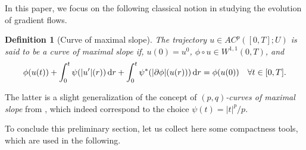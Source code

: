 \documentclass[reqno]{amsart}
\newcommand{\dr}{{\rm d} r}
\renewcommand{\sl}{|\partial \phi|}
\newtheorem{definition}[theorem]{Definition}
\begin{document}
In this paper, we focus on the following classical notion  \cite{Muratori-Savare} in studying the evolution of gradient flows. 

\begin{definition}[Curve of maximal slope]\label{def:curve}
  The trajectory $u\in AC^p([0,T];U)$ is said to be a \emph{curve of
    maximal slope}
  if, $u(0)=u^0$, $\phi\circ u \in W^{1,1}(0,T)$, and 
  \begin{equation}
    \label{eq:curve}
    \phi(u(t)) + \int_0^t \psi(|u'|(r)) \, \dr  +   \int_0^t
    \psi^*(\sl(u(r)))\, \dr =
    \phi(u(0)) \quad \forall t \in [0,T].
  \end{equation}
\end{definition}

The latter is a slight generalization of the concept of {\it $(p,q)$-curves
of maximal slope} from \cite[Def.~1.3.2, p.~32]{Ambrosio08},
which indeed correspond to the choice $\psi(t)=|t|^p/p$.

To conclude this preliminary section,  let us collect here some compactness tools,
which are used in the following.
\end{document}
